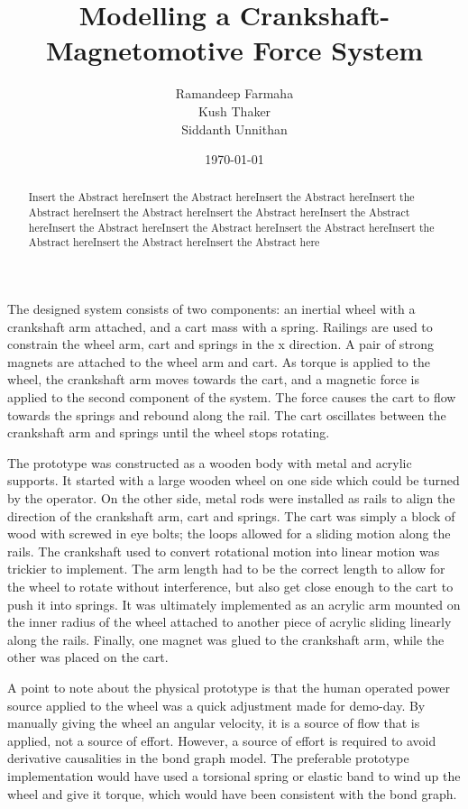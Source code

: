 \documentclass[notitlepage,11pt]{report}
\title{Modelling a Crankshaft-Magnetomotive Force System}
\author{Ramandeep Farmaha \\ Kush Thaker \\ Siddanth Unnithan}
\date{\today}
\begin{document}
\maketitle
\thispagestyle{empty}

\begin{abstract}
Insert the Abstract hereInsert the Abstract hereInsert the Abstract hereInsert the Abstract hereInsert the Abstract hereInsert the Abstract hereInsert the Abstract hereInsert the Abstract hereInsert the Abstract hereInsert the Abstract hereInsert the Abstract hereInsert the Abstract hereInsert the Abstract here
\end{abstract}
\begin{multicols}{2}
The designed system consists of two components: an inertial wheel with a crankshaft arm attached, and a cart mass with a spring. Railings are used to constrain the wheel arm, cart and springs in the x direction. A pair of strong magnets are attached to the wheel arm and cart. As torque is applied to the wheel, the crankshaft arm moves towards the cart, and a magnetic force is applied to the second component of the system. The force causes the cart to flow towards the springs and rebound along the rail. The cart oscillates between the crankshaft arm and springs until the wheel stops rotating.

The prototype was constructed as a wooden body with metal and acrylic supports. It started with a large wooden wheel on one side which could be turned by the operator. On the other side, metal rods were installed as rails to align the direction of the crankshaft arm, cart and springs. The cart was simply a block of wood with screwed in eye bolts; the loops allowed for a sliding motion along the rails. The crankshaft used to convert rotational motion into linear motion was trickier to implement. The arm length had to be the correct length to allow for the wheel to rotate without interference, but also get close enough to the cart to push it into springs. It was ultimately implemented as an acrylic arm mounted on the inner radius of the wheel attached to another piece of acrylic sliding linearly along the rails. Finally, one magnet was glued to the crankshaft arm, while the other was placed on the cart.

A point to note about the physical prototype is that the human operated power source applied to the wheel was a quick adjustment made for demo-day. By manually giving the wheel an angular velocity, it is a source of flow that is applied, not a source of effort. However, a source of effort is required to avoid derivative causalities in the bond graph model. The preferable prototype implementation would have used a torsional spring or elastic band to wind up the wheel and give it torque, which would have been consistent with the bond graph.


\end{multicols}
\end{document}
